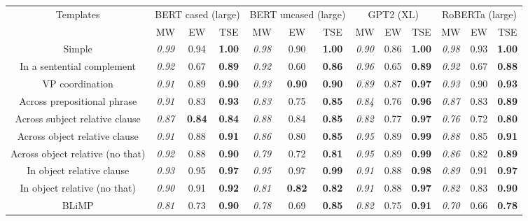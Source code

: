 \begin{tabular}{c | ccc | ccc | ccc | ccc }
\toprule
Templates & \multicolumn{3}{c}{BERT cased (large)}& \multicolumn{3}{|c}{BERT uncased (large)}& \multicolumn{3}{|c}{GPT2 (XL)}& \multicolumn{3}{|c}{RoBERTa (large)}\\
& MW & EW & TSE & MW & EW & TSE & MW & EW & TSE & MW & EW & TSE \\
\midrule
Simple & \textit{0.99}& 0.94 & \textbf{1.00} & \textit{0.98}& 0.90 & \textbf{1.00} & \textit{0.90}& 0.86 & \textbf{1.00} & \textit{0.98}& 0.93 & \textbf{1.00} \\
In a sentential complement & \textit{0.92}& 0.67 & \textbf{0.89} & \textit{0.92}& 0.60 & \textbf{0.86} & \textit{0.96}& 0.65 & \textbf{0.89} & \textit{0.92}& 0.67 & \textbf{0.88} \\
VP coordination & \textit{0.91}& 0.89 & \textbf{0.90} & \textit{0.93}& \textbf{0.90} & \textbf{0.90} & \textit{0.89}& 0.87 & \textbf{0.97} & \textit{0.93}& 0.90 & \textbf{0.93} \\
Across prepositional phrase & \textit{0.91}& 0.83 & \textbf{0.93} & \textit{0.83}& 0.75 & \textbf{0.85} & \textit{0.84}& 0.76 & \textbf{0.96} & \textit{0.87}& 0.83 & \textbf{0.89} \\
Across subject relative clause & \textit{0.87}& \textbf{0.84} & \textbf{0.84} & \textit{0.88}& 0.84 & \textbf{0.85} & \textit{0.82}& 0.77 & \textbf{0.97} & \textit{0.76}& 0.72 & \textbf{0.80} \\
Across object relative clause & \textit{0.91}& 0.88 & \textbf{0.91} & \textit{0.86}& 0.80 & \textbf{0.85} & \textit{0.95}& 0.89 & \textbf{0.99} & \textit{0.88}& 0.85 & \textbf{0.91} \\
Across object relative (no that) & \textit{0.92}& 0.88 & \textbf{0.90} & \textit{0.79}& 0.72 & \textbf{0.81} & \textit{0.95}& 0.89 & \textbf{0.99} & \textit{0.86}& 0.82 & \textbf{0.89} \\
In object relative clause & \textit{0.93}& 0.95 & \textbf{0.97} & \textit{0.95}& 0.97 & \textbf{0.99} & \textit{0.91}& 0.88 & \textbf{0.98} & \textit{0.89}& 0.91 & \textbf{0.97} \\
In object relative (no that) & \textit{0.90}& 0.91 & \textbf{0.92} & \textit{0.81}& \textbf{0.82} & \textbf{0.82} & \textit{0.91}& 0.88 & \textbf{0.97} & \textit{0.82}& 0.83 & \textbf{0.90} \\
BLiMP & \textit{0.81}& 0.73 & \textbf{0.90} & \textit{0.78}& 0.69 & \textbf{0.85} & \textit{0.82}& 0.75 & \textbf{0.91} & \textit{0.70}& 0.66 & \textbf{0.78} \\
\bottomrule
\end{tabular}